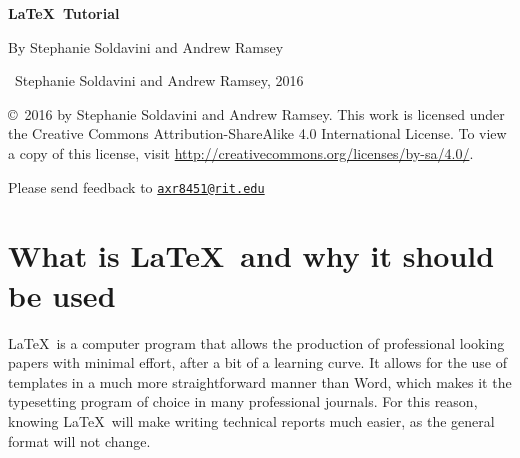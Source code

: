 \documentclass[11pt]{article}
\begin{document}
\vspace*{2.5cm} 

\begin{center}
    \LARGE
    \textbf{\LaTeX\ Tutorial}\\ 

    \medskip

    \large
    By Stephanie Soldavini and Andrew Ramsey 
\end{center}
\vfill
\ccbysa\ Stephanie Soldavini and Andrew Ramsey, 2016 

\copyright\ 2016 by Stephanie Soldavini and Andrew Ramsey. This work is licensed under the Creative Commons Attribution-ShareAlike 4.0 International License. To view a copy of this license, visit \url{http://creativecommons.org/licenses/by-sa/4.0/}.

Please send feedback to \href{mailto:axr8451@rit.edu}{\nolinkurl{axr8451@rit.edu}}

\newpage


\section*{What is \LaTeX\ and why it should be used}
\LaTeX\ is a computer program that allows the production of professional looking papers with minimal effort, after a bit of a learning curve. It allows for the use of templates in a much more straightforward manner than Word, which makes it the typesetting program of choice in many professional journals. For this reason, knowing \LaTeX\ will make writing technical reports much easier, as the general format will not change.
\end{document}
